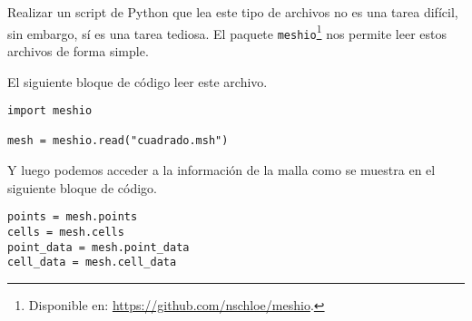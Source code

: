 Realizar un script de Python que lea este tipo de archivos no es una tarea difícil, sin embargo, sí es una tarea tediosa. El paquete \texttt{meshio}\footnote{Disponible en: \url{https://github.com/nschloe/meshio}.} nos permite leer estos archivos de forma simple.

El siguiente bloque de código leer este archivo.
\begin{verbatim}
import meshio

mesh = meshio.read("cuadrado.msh")
\end{verbatim}

Y luego podemos acceder a la información de la malla como se muestra en el siguiente bloque de código.
\begin{verbatim}
points = mesh.points
cells = mesh.cells
point_data = mesh.point_data
cell_data = mesh.cell_data
\end{verbatim}





